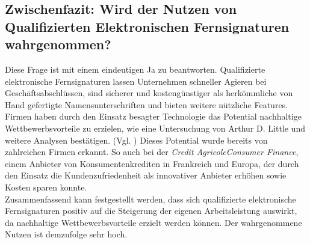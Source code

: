 \documentclass[deutsch]{lib/llncs/llncs}
\begin{document}
\subsection{Zwischenfazit: Wird der Nutzen von Qualifizierten Elektronischen Fernsignaturen wahrgenommen?}
Diese Frage ist mit einem eindeutigen Ja zu beantworten. Qualifizierte elektronische Fernsignaturen lassen Unternehmen schneller Agieren bei Geschäftsabschlüssen, sind sicherer und kostengünstiger als herkömmliche von Hand gefertigte Namensunterschriften und bieten weitere nützliche Features. \\
Firmen haben durch den Einsatz besagter Technologie das Potential nachhaltige Wettbewerbsvorteile zu erzielen, wie eine Untersuchung von Arthur D. Little und weitere Analysen bestätigen. (Vgl. \cite[S. 7]{Zitat05})
Dieses Potential wurde bereits von zahlreichen Firmen erkannt. So auch bei der \textit{Credit AgricoleConsumer Finance}, einem Anbieter von Konsumentenkrediten in Frankreich und Europa, der durch den Einsatz die Kundenzufriedenheit als innovativer Anbieter erhöhen sowie Kosten sparen konnte. \cite[S. 13]{Zitat05} \\
Zusammenfassend kann festgestellt werden, dass sich qualifizierte elektronische Fernsignaturen positiv auf die Steigerung der eigenen Arbeitsleistung auswirkt, da nachhaltige Wettbewerbsvorteile erzielt werden können. Der wahrgenommene Nutzen ist demzufolge sehr hoch. 




\end{document}
